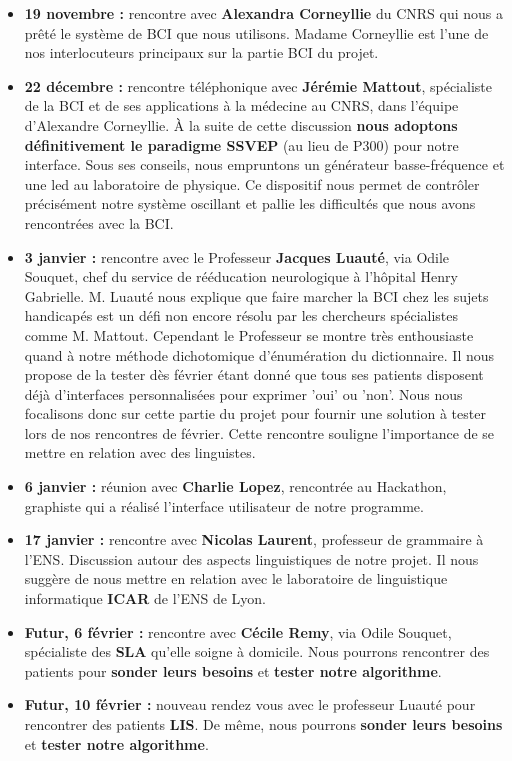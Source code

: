 \documentclass[12pt]{article}
\begin{document}
\begin{itemize}
		\item \textbf{19 novembre : } rencontre avec \textbf{Alexandra Corneyllie} du CNRS qui nous a prêté le système de BCI que nous utilisons. Madame Corneyllie est l'une de nos interlocuteurs principaux sur la partie BCI du projet. \\ 
		\item \textbf{22 décembre : } rencontre téléphonique avec \textbf{Jérémie Mattout}, spécialiste de la BCI et de ses applications à la médecine au CNRS, dans l'équipe d'Alexandre Corneyllie. À la suite de cette discussion \textbf{nous adoptons définitivement le paradigme SSVEP} (au lieu de P300) pour notre interface. Sous ses conseils, nous empruntons un générateur basse-fréquence et une led au laboratoire de physique. Ce dispositif nous permet de contrôler précisément notre système oscillant et pallie les difficultés que nous avons rencontrées avec la BCI. \\
		\item \textbf{3 janvier : } rencontre avec le Professeur \textbf{Jacques Luauté}, via Odile Souquet, chef du service de rééducation neurologique à l'hôpital Henry Gabrielle. M. Luauté nous explique que faire marcher la BCI chez les sujets handicapés est un défi non encore résolu par les chercheurs spécialistes comme M. Mattout. Cependant le Professeur se montre très enthousiaste quand à notre méthode dichotomique d'énumération du dictionnaire. Il nous propose de la tester dès février étant donné que tous ses patients disposent déjà d'interfaces personnalisées pour exprimer 'oui' ou 'non'. Nous nous focalisons donc sur cette partie du projet pour fournir une solution à tester lors de nos rencontres de février. Cette rencontre souligne l'importance de se mettre en relation avec des linguistes. \\
		\item \textbf{6 janvier : } réunion avec \textbf{Charlie Lopez}, rencontrée au Hackathon, graphiste qui a réalisé l'interface utilisateur de notre programme. \\
		\item \textbf{17 janvier : } rencontre avec \textbf{Nicolas Laurent}, professeur de grammaire à l'ENS. Discussion autour des aspects linguistiques de notre projet. Il nous suggère de nous mettre en relation avec le laboratoire de linguistique informatique \textbf{ICAR} de l'ENS de Lyon. \\
		\item \textbf{Futur, 6 février : } rencontre avec \textbf{Cécile Remy}, via Odile Souquet, spécialiste des \textbf{SLA} qu'elle soigne à domicile. Nous pourrons rencontrer des patients pour \textbf{sonder leurs besoins} et \textbf{tester notre algorithme}. \\
		\item \textbf{Futur, 10 février : } nouveau rendez vous avec le professeur Luauté pour rencontrer des patients \textbf{LIS}. De même, nous pourrons \textbf{sonder leurs besoins} et \textbf{tester notre algorithme}.
	\end{itemize}		
	
\end{document}
